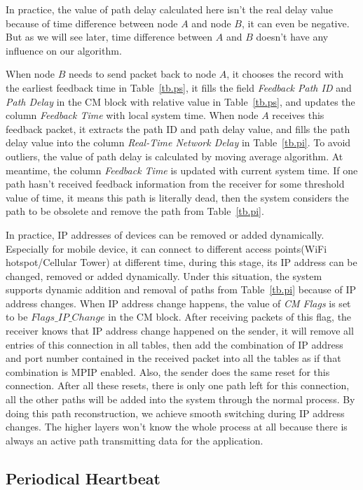In practice, the value of path delay calculated here isn't the real delay value because of time difference between node $A$ and node $B$, it can even be negative. But as we will see later, time difference between $A$ and $B$ doesn't have any influence on our algorithm.

When node $B$ needs to send packet back to node $A$, it chooses the record with the earliest feedback time in Table~\ref{tb.ps}, it fills the field \emph{Feedback Path ID} and \emph{Path Delay} in the CM block with relative value in Table~\ref{tb.ps}, and updates the column \emph{Feedback Time} with local system time. When node $A$ receives this feedback packet, it extracts the path ID and path delay value, and fills the path delay value into the column \emph{Real-Time Network Delay} in Table~\ref{tb.pi}. To avoid outliers, the value of path delay is calculated by moving average algorithm. At meantime, the column \emph{Feedback Time} is updated with current system time. If one path hasn't received feedback information from the receiver for some threshold value of time, it means this path is literally dead, then the system considers the path to be obsolete and remove the path from Table~\ref{tb.pi}.

In practice, IP addresses of devices can be removed or added dynamically. Especially for mobile device, it can connect to different access points(WiFi hotspot/Cellular Tower) at different time, during this stage, its IP address can be changed, removed or added dynamically. Under this situation, the system supports dynamic addition and removal of paths from Table~\ref{tb.pi} because of IP address changes. When IP address change happens, the value of \emph{CM Flags} is set to be $Flags\_IP\_Change$ in the CM block. After receiving packets of this flag, the receiver knows that IP address change happened on the sender, it will remove all entries of this connection in all tables, then add the combination of IP address and port number contained in the received packet into all the tables as if that combination is MPIP enabled.
Also, the sender does the same reset for this connection. After all these resets, there is only one path left for this connection, all the other paths will be added into the system through the normal process. By doing this path reconstruction, we achieve smooth switching during IP address changes. The higher layers won't know the whole process at all because there is always an active path transmitting data for the application.


\subsection{Periodical Heartbeat}

